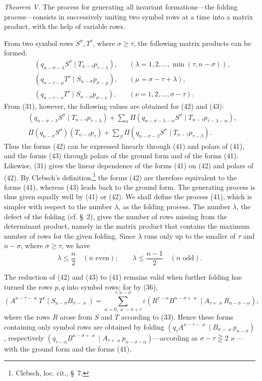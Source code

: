 \documentclass[10pt]{article}
\newcommand{\pair}[2]{(#1\mid #2)}
\newcommand{\eps}{\varepsilon}
\begin{document}
\emph{Theorem V.} The process for generating all invariant formations---the
folding process---consists in successively uniting two symbol rows at a time
into a matrix product, with the help of variable rows.

From two symbol rows $S^\sigma,T^\tau$, where $\sigma\geq\tau$, the following
matrix products can be formed:
\begin{align}
&\pair{q_{n-\sigma-\lambda}S^\sigma}
 {T_{n-\tau}p_{\tau-\lambda}},
 &&(\lambda=1,2,\ldots,\min(\tau,n-\sigma)),\tag{41}\\
&\pair{q_{n-\tau-\mu}T^\tau}
 {S_{n-\sigma}p_{\sigma-\mu}},
 &&(\mu=\sigma-\tau+\lambda),\tag{42}\\
&\pair{q_{n-\tau-\nu}T^\tau}
 {S_{n-\sigma}p_{\sigma-\nu}},
 &&(\nu=1,2,\ldots,\sigma-\tau).
\tag{43}
\end{align}
From (31), however, the following values are obtained for (42) and (43):
\begin{align}
&\pair{q_{n-\sigma-\lambda}S^\sigma}
 {T_{n-\tau}p_{\tau-\lambda}}
 +\sum_{\alpha}\Pi\pair{q_{n-\sigma-\lambda-\alpha}S^\sigma}
 {T_{n-\tau}p_{\tau-\lambda-\alpha}},\tag{42a}\\
&\Pi(q_{n-\sigma}S^\sigma)(T_{n-\tau}p_\tau)
 +\sum_{\beta}\Pi\pair{q_{n-\sigma-\beta}S^\sigma}
 {T_{n-\tau}p_{\tau-\beta}}.
\tag{43a}
\end{align}
Thus the forms (42) can be expressed linearly through (41) and polars of
(41), and the forms (43) through polars of the ground form and of the forms
(41). Likewise, (31) gives the linear dependence of the forms (41) on (42)
and polars of (42). By Clebsch's definition,\footnote{Clebsch, loc. cit.,
\S\ 7.} the forms (42) are therefore equivalent to the forms (41), whereas
(43) leads back to the ground form. The generating process is thus given
equally well by (41) or (42). We shall define the process (41), which is
simpler with respect to the number $\lambda$, as the folding process. The
number $\lambda$, the defect of the folding (cf. \S\ 2), gives the number of
rows missing from the determinant product, namely in the matrix product that
contains the maximum number of rows for the given folding. Since $\lambda$
runs only up to the smaller of $\tau$ and $n-\sigma$, where
$\sigma\geq\tau$, we have
\begin{equation}
 \lambda\leq\frac n2\quad(n\text{ even});\qquad
 \lambda\leq\frac{n-1}{2}\quad(n\text{ odd}).
\tag{44}
\end{equation}

The reduction of (42) and (43) to (41) remains valid when further folding has
turned the rows $p,q$ into symbol rows; for by (36),
\[
 \pair{A^{n-\tau-\varkappa}T^\tau}
 {S_{n-\sigma}B_{\sigma-\varkappa}}
 =\sum_{\alpha=0,\varkappa-\sigma+\tau}^{\tau,n-\sigma}
 \eps\pair{R^{\tau-\alpha}B^{n-\sigma+\varkappa}}
 {A_{\tau+\varkappa}R_{n-\sigma-\alpha}},
\]
where the rows $R$ arose from $S$ and $T$ according to (33). Hence these
forms containing only symbol rows are obtained by folding
$\pair{q_\tau A^{n-\tau-\varkappa}}
{B_{\sigma-\varkappa}p_{n-\sigma}}$, respectively
$\pair{q_{\tau-\alpha}B^{n-\sigma+\varkappa}}
{A_{\tau+\varkappa}p_{n-\sigma-\alpha}}$---according as
$\sigma-\tau\gtreqless 2\varkappa$---with the ground form and the forms (41).
\end{document}
